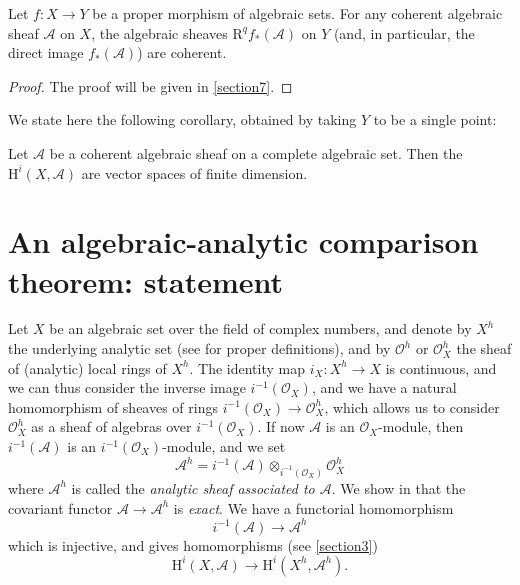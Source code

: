 \documentclass{article}
\theoremstyle{plain}
\newenvironment{theorem}[1]
    {\renewcommand\theinnercustomtheorem{#1}\innercustomtheorem}
    {\endinnercustomtheorem}
\newenvironment{corollary}[1]
    {\renewcommand\theinnercustomcorollary{#1}\innercustomcorollary}
    {\endinnercustomcorollary}
\theoremstyle{definition}
\newcommand{\sh}{\mathscr}
\newcommand{\HH}{\mathrm{H}}
\newcommand{\RR}{\mathrm{R}}
\begin{document}
\begin{theorem}{4}
\label{theorem4}
  Let $f\colon X\to Y$ be a proper morphism of algebraic sets.
  For any coherent algebraic sheaf $\sh{A}$ on $X$, the algebraic sheaves $\RR^qf_*(\sh{A})$ on $Y$ (and, in particular, the direct image $f_*(\sh{A})$) are coherent.
\end{theorem}

\begin{proof}
  The proof will be given in \cref{section7}.
\end{proof}

We state here the following corollary, obtained by taking $Y$ to be a single point:

\begin{corollary}{\!\!}
  Let $\sh{A}$ be a coherent algebraic sheaf on a complete algebraic set.
  Then the $\HH^i(X,\sh{A})$ are vector spaces of finite dimension.
\end{corollary}


\section{An algebraic-analytic comparison theorem: statement}
\label{section6}

Let $X$ be an algebraic set over the field of complex numbers, and denote by $X^h$ the underlying analytic set (see \cite{2} for proper definitions), and by $\sh{O}^h$ or $\sh{O}_X^h$ the sheaf of (analytic) local rings of $X^h$.
The identity map $i_X\colon X^h\to X$ is continuous, and we can thus consider the inverse image $i^{-1}(\sh{O}_X)$, and we have a natural homomorphism of sheaves of rings $i^{-1}(\sh{O}_X)\to\sh{O}_X^h$, which allows us to consider $\sh{O}_X^h$ as a sheaf of algebras over $i^{-1}(\sh{O}_X)$.
If now $\sh{A}$ is an $\sh{O}_X$-module, then $i^{-1}(\sh{A})$ is an $i^{-1}(\sh{O}_X)$-module, and we set
\[
  \sh{A}^h = i^{-1}(\sh{A})\otimes_{i^{-1}(\sh{O}_X)}\sh{O}_X^h
\]
where $\sh{A}^h$ is called the \emph{analytic sheaf associated to $\sh{A}$}.
We show in \cite{2} that the covariant functor $\sh{A}\to\sh{A}^h$ is \emph{exact}.
We have a functorial homomorphism
\[
  i^{-1}(\sh{A}) \to \sh{A}^h
\]
which is injective, and gives homomorphisms (see \cref{section3})
\[
\label{equation2}
  \HH^i(X,\sh{A}) \to \HH^i(X^h,\sh{A}^h).
  \tag{2}
\]
\end{document}

